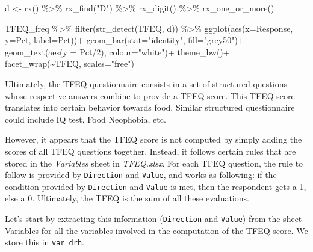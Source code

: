 \documentclass[
]{book}
\newenvironment{Shaded}{\begin{snugshade}}{\end{snugshade}}
\newcommand{\AttributeTok}[1]{\textcolor[rgb]{0.77,0.63,0.00}{#1}}
\newcommand{\DecValTok}[1]{\textcolor[rgb]{0.00,0.00,0.81}{#1}}
\newcommand{\FunctionTok}[1]{\textcolor[rgb]{0.00,0.00,0.00}{#1}}
\newcommand{\NormalTok}[1]{#1}
\newcommand{\OtherTok}[1]{\textcolor[rgb]{0.56,0.35,0.01}{#1}}
\newcommand{\SpecialCharTok}[1]{\textcolor[rgb]{0.00,0.00,0.00}{#1}}
\newcommand{\StringTok}[1]{\textcolor[rgb]{0.31,0.60,0.02}{#1}}
\begin{document}
\begin{Shaded}
\begin{Highlighting}[]
\NormalTok{d }\OtherTok{\textless{}{-}} \FunctionTok{rx}\NormalTok{() }\SpecialCharTok{\%\textgreater{}\%} 
  \FunctionTok{rx\_find}\NormalTok{(}\StringTok{"D"}\NormalTok{) }\SpecialCharTok{\%\textgreater{}\%} 
  \FunctionTok{rx\_digit}\NormalTok{() }\SpecialCharTok{\%\textgreater{}\%} 
  \FunctionTok{rx\_one\_or\_more}\NormalTok{()}

\NormalTok{TFEQ\_freq }\SpecialCharTok{\%\textgreater{}\%} 
  \FunctionTok{filter}\NormalTok{(}\FunctionTok{str\_detect}\NormalTok{(TFEQ, d)) }\SpecialCharTok{\%\textgreater{}\%} 
  \FunctionTok{ggplot}\NormalTok{(}\FunctionTok{aes}\NormalTok{(}\AttributeTok{x=}\NormalTok{Response, }\AttributeTok{y=}\NormalTok{Pct, }\AttributeTok{label=}\NormalTok{Pct))}\SpecialCharTok{+}
  \FunctionTok{geom\_bar}\NormalTok{(}\AttributeTok{stat=}\StringTok{"identity"}\NormalTok{, }\AttributeTok{fill=}\StringTok{"grey50"}\NormalTok{)}\SpecialCharTok{+}
  \FunctionTok{geom\_text}\NormalTok{(}\FunctionTok{aes}\NormalTok{(}\AttributeTok{y =}\NormalTok{ Pct}\SpecialCharTok{/}\DecValTok{2}\NormalTok{), }\AttributeTok{colour=}\StringTok{"white"}\NormalTok{)}\SpecialCharTok{+}
  \FunctionTok{theme\_bw}\NormalTok{()}\SpecialCharTok{+}
  \FunctionTok{facet\_wrap}\NormalTok{(}\SpecialCharTok{\textasciitilde{}}\NormalTok{TFEQ, }\AttributeTok{scales=}\StringTok{"free"}\NormalTok{)}
\end{Highlighting}
\end{Shaded}

Ultimately, the TFEQ questionnaire consists in a set of structured questions whose respective answers combine to provide a TFEQ score. This TFEQ score translates into certain behavior towards food. Similar structured questionnaire could include IQ test, Food Neophobia, etc.

However, it appears that the TFEQ score is not computed by simply adding the scores of all TFEQ questions together. Instead, it follows certain rules that are stored in the \emph{Variables} sheet in \emph{TFEQ.xlsx}. For each TFEQ question, the rule to follow is provided by \texttt{Direction} and \texttt{Value}, and works as following: if the condition provided by \texttt{Direction} and \texttt{Value} is met, then the respondent gets a 1, else a 0. Ultimately, the TFEQ is the sum of all these evaluations.

Let's start by extracting this information (\texttt{Direction} and \texttt{Value}) from the sheet Variables for all the variables involved in the computation of the TFEQ score. We store this in \texttt{var\_drh}.
\end{document}
